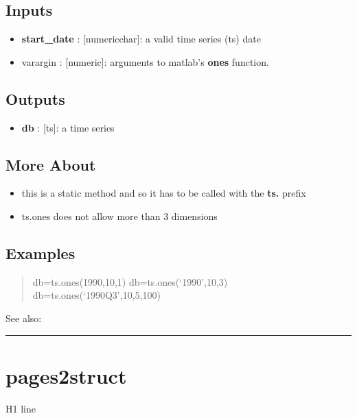 \documentclass[letterpaper,10pt,english]{sphinxmanual}
\begin{document}
\subsection{Inputs}
\label{classes/time_series/@ts/ts:id417}\begin{itemize}
\item {} 
\textbf{start\_date} : {[}numeric\textbar{}char{]}: a valid time series (ts) date

\item {} 
varargin : {[}numeric{]}: arguments to matlab's \textbf{ones} function.

\end{itemize}


\subsection{Outputs}
\label{classes/time_series/@ts/ts:id418}\begin{itemize}
\item {} 
\textbf{db} : {[}ts{]}: a time series

\end{itemize}


\subsection{More About}
\label{classes/time_series/@ts/ts:id419}\begin{itemize}
\item {} 
this is a static method and so it has to be called with the \textbf{ts.}
prefix

\item {} 
ts.ones does not allow more than 3 dimensions

\end{itemize}


\subsection{Examples}
\label{classes/time_series/@ts/ts:id420}\begin{quote}

db=ts.ones(1990,10,1)
db=ts.ones(`1990',10,3)
db=ts.ones(`1990Q3',10,5,100)
\end{quote}

See also:


\bigskip\hrule{}\bigskip



\section{pages2struct}
\label{classes/time_series/@ts/ts:pages2struct}\label{classes/time_series/@ts/ts:id421}
H1 line
\end{document}
